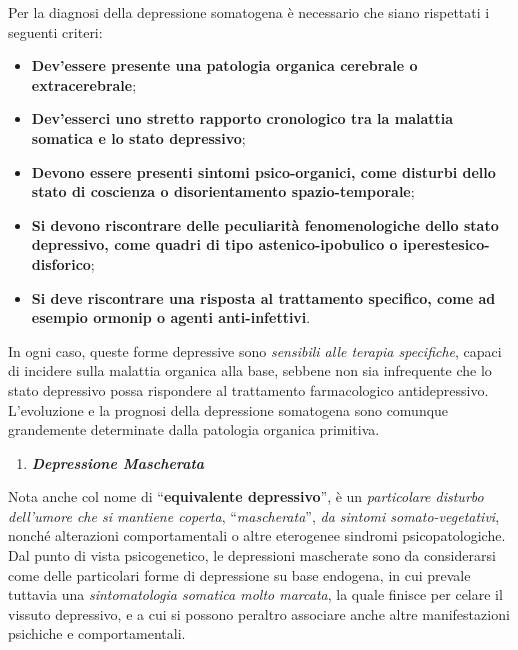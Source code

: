 \documentclass[]{article}
\begin{document}
Per la diagnosi della depressione somatogena è necessario che siano
rispettati i seguenti criteri:

\begin{itemize}
\item
  \textbf{Dev'essere presente una patologia organica cerebrale o
  extracerebrale};
\item
  \textbf{Dev'esserci uno stretto rapporto cronologico tra la malattia
  somatica e lo stato depressivo};
\item
  \textbf{Devono essere presenti sintomi psico-organici, come disturbi
  dello stato di coscienza o disorientamento spazio-temporale};
\item
  \textbf{Si devono riscontrare delle peculiarità fenomenologiche dello
  stato depressivo, come quadri di tipo astenico-ipobulico o
  iperestesico-disforico};
\item
  \textbf{Si deve riscontrare una risposta al trattamento specifico,
  come ad esempio ormonip o agenti anti-infettivi}.
\end{itemize}

In ogni caso, queste forme depressive sono \emph{sensibili alle terapia
specifiche}, capaci di incidere sulla malattia organica alla base,
sebbene non sia infrequente che lo stato depressivo possa rispondere al
trattamento farmacologico antidepressivo. L'evoluzione e la prognosi
della depressione somatogena sono comunque grandemente determinate dalla
patologia organica primitiva.

\begin{enumerate}
\def\labelenumi{\arabic{enumi}.}
\item
  \textbf{\emph{Depressione Mascherata}}
\end{enumerate}

Nota anche col nome di ``\textbf{equivalente depressivo}'', è un
\emph{particolare disturbo dell'umore che si mantiene coperta},
``\emph{mascherata}'', \emph{da sintomi somato-vegetativi}, nonché
alterazioni comportamentali o altre eterogenee sindromi
psicopatologiche. Dal punto di vista psicogenetico, le depressioni
mascherate sono da considerarsi come delle particolari forme di
depressione su base endogena, in cui prevale tuttavia una
\emph{sintomatologia somatica molto marcata}, la quale finisce per
celare il vissuto depressivo, e a cui si possono peraltro associare
anche altre manifestazioni psichiche e comportamentali.
\end{document}
